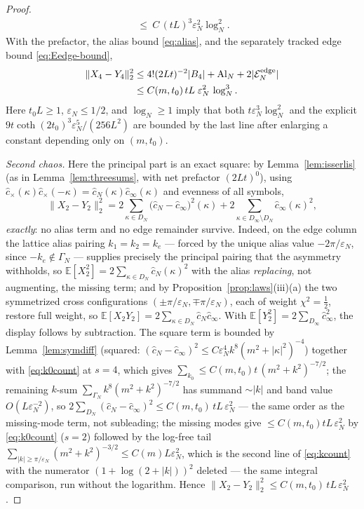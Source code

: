 \documentclass[11pt,a4paper]{article}
\theoremstyle{plain}
\theoremstyle{definition}
\newcommand{\E}{\mathbb{E}}
\newcommand{\eps}{\varepsilon}
\DeclareMathOperator{\cth}{coth}
\begin{document}
\begin{proof}
\begin{align*}
 \ \le\ C\,(tL)^3\eps_N^2\log_N^2 .
\end{align*}
With the prefactor, the alias bound \eqref{eq:alias}, and the separately
tracked edge bound \eqref{eq:Eedge-bound},
\begin{equation}
 \begin{split}
 \|X_4-Y_4\|_2^2
 &\le4!(2Lt)^{-2}|B_4|+\mathrm{Al}_N
       +2|\mathcal E_N^{\rm edge}|\\
 &\le C(m,t_0)\,tL\;\eps_N^2\,\log_N^3 .
 \end{split}
 \label{eq:X4rate}
\end{equation}
Here $t_0L\ge1$, $\eps_N\le1/2$, and $\log_N\ge1$ imply that both
$t\eps_N^3\log_N^2$ and the explicit
$9t\cth(2t_0)^3\eps_N^5/(256L^2)$ are bounded by the last line after
enlarging a constant depending only on $(m,t_0)$.

\emph{Second chaos.} Here the principal part is an exact square: by
Lemma~\ref{lem:isserlis} (as in Lemma~\ref{lem:threesums}, with net
prefactor $(2Lt)^0$), using $\hat c_\times(\kappa)\hat c_\times(-\kappa)
=\hat c_N(\kappa)\hat c_\infty(\kappa)$ and evenness of all symbols,
\[
 \|X_2-Y_2\|_2^2
 =2\sum_{\kappa\in D_N}\bigl(\hat c_N-\hat c_\infty\bigr)^2(\kappa)
 +2\sum_{\kappa\in D_\infty\setminus D_N}\hat c_\infty(\kappa)^2 ,
\]
\emph{exactly}: no alias term and no edge remainder survive. Indeed, on the edge
column the lattice alias pairing $k_1=k_2=k_e$ --- forced by the unique alias value
$-2\pi/\eps_N$, since $-k_e\notin\Gamma_N$ --- supplies precisely the principal
pairing that the asymmetry withholds, so
$\E[X_2^2]=2\sum_{\kappa\in D_N}\hat c_N(\kappa)^2$ with the alias \emph{replacing},
not augmenting, the missing term; and by Proposition~\ref{prop:laws}(iii)(a) the two
symmetrized cross configurations $(\pm\pi/\eps_N,\mp\pi/\eps_N)$, each of weight
$\chi^2=\tfrac12$, restore full weight, so
$\E[X_2Y_2]=2\sum_{\kappa\in D_N}\hat c_N\hat c_\infty$. With
$\E[Y_2^2]=2\sum_{D_\infty}\hat c_\infty^2$, the display follows by subtraction. The square term is bounded by
Lemma~\ref{lem:symdiff} (squared: $(\hat c_N-\hat c_\infty)^2\le
C\eps_N^4k^8(m^2+|\kappa|^2)^{-4}$) together with \eqref{eq:k0count} at
$s=4$, which gives $\sum_{k_0}\le C(m,t_0)t\,(m^2+k^2)^{-7/2}$; the
remaining $k$-sum $\sum_{\Gamma_N}k^8(m^2+k^2)^{-7/2}$ has summand
$\sim|k|$ and band value $O(L\eps_N^{-2})$, so
$2\sum_{D_N}(\hat c_N-\hat c_\infty)^2\le C(m,t_0)\,tL\,\eps_N^{2}$ --- the
same order as the missing-mode term, not subleading;
the missing modes give $\le C(m,t_0)tL\,\eps_N^2$ by \eqref{eq:k0count} ($s=2$)
followed by the log-free tail
$\sum_{|k|\ge\pi/\eps_N}(m^2+k^2)^{-3/2}\le C(m)L\eps_N^2$, which is the second line
of \eqref{eq:kcount} with the numerator $(1+\log(2+|k|))^2$ deleted --- the same
integral comparison, run without the logarithm. Hence
$\|X_2-Y_2\|_2^2\le C(m,t_0)\,tL\,\eps_N^2$.


\end{proof}
\end{document}
